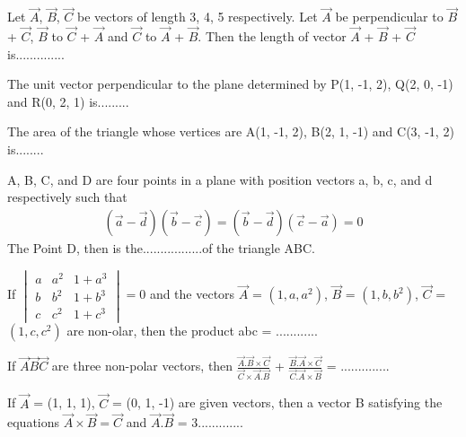 \item Let $\overrightarrow{A}$, $\overrightarrow{B}$, $\overrightarrow{C}$ be vectors of length 3, 4, 5 respectively. Let $\overrightarrow{A}$ be perpendicular to $\overrightarrow{B}$ + $\overrightarrow{C}$, $\overrightarrow{B}$ to 
$\overrightarrow{C}$ + $\overrightarrow{A}$ and $\overrightarrow{C}$ to $\overrightarrow{A}$ + $\overrightarrow{B}$. Then the length of vector $\overrightarrow{A}$ + $\overrightarrow{B}$ + $\overrightarrow{C}$ is..............

\item The unit vector perpendicular to the plane determined by P(1, -1, 2), Q(2, 0, -1) and R(0, 2, 1) is.........

\item The area of the triangle whose vertices are  A(1, -1, 2), B(2, 1, -1) and C(3, -1, 2) is........

\item A, B, C, and D are four points in a plane with position vectors a, b, c, and d respectively such that
\begin{align*}
(\overrightarrow{a} - \overrightarrow{d}) (\overrightarrow{b} - \overrightarrow{c}) 
= (\overrightarrow{b} - \overrightarrow{d}) (\overrightarrow{c} - \overrightarrow{a}) = 0
\end{align*}
The Point D, then is the.................of the triangle ABC.

\item If 
$\begin{vmatrix}
a & a^{2} & 1 + a^{3} \\ b & b^{2} & 1 + b^{3} \\ c & c^{2} & 1 + c^{3} 
\end{vmatrix} = 0$ 
and the vectors $\overrightarrow{A}$ = $(1, a, a^{2})$, $\overrightarrow{B}$ = $(1, b, b^{2})$, $\overrightarrow{C}$ = $(1, c, c^{2})$ are non-olar, then the product abc = ............

\item If $\overrightarrow{A} \overrightarrow{B} \overrightarrow{C}$ are three non-polar vectors, then 
$\frac{\overrightarrow{A} . \overrightarrow{B} \times \overrightarrow{C}}{\overrightarrow{C} \times \overrightarrow{A} . \overrightarrow{B}}$ + $\frac{\overrightarrow{B} . \overrightarrow{A} \times \overrightarrow{C}}{\overrightarrow{C} . \overrightarrow{A} \times \overrightarrow{B}}$ = ..............

\item If $\overrightarrow{A}$ = (1, 1, 1), $\overrightarrow{C}$ = (0, 1, -1) are given vectors, then a vector B satisfying the equations $\overrightarrow{A} \times \overrightarrow{B} = \overrightarrow{C}$ and 
$\overrightarrow{A} . \overrightarrow{B}$ = 3.............


